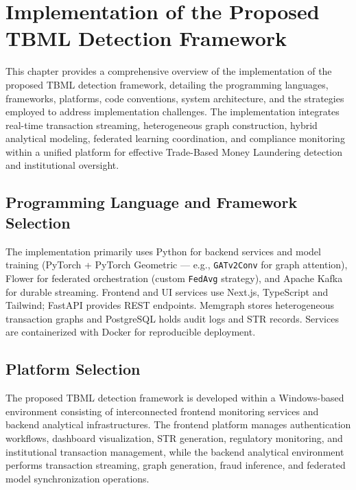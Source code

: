 \chapter{Implementation of the Proposed TBML Detection Framework}

This chapter provides a comprehensive overview of the implementation of the proposed TBML detection framework, detailing the programming languages, frameworks, platforms, code conventions, system architecture, and the strategies employed to address implementation challenges. The implementation integrates real-time transaction streaming, heterogeneous graph construction, hybrid analytical modeling, federated learning coordination, and compliance monitoring within a unified platform for effective Trade-Based Money Laundering detection and institutional oversight.

\section[Programming Language and Framework Selection]{\textbf{Programming Language and Framework Selection}}

The implementation primarily uses Python for backend services and model training (PyTorch + PyTorch Geometric — e.g., \texttt{GATv2Conv} for graph attention), Flower for federated orchestration (custom \texttt{FedAvg} strategy), and Apache Kafka for durable streaming. Frontend and UI services use Next.js, TypeScript and Tailwind; FastAPI provides REST endpoints. Memgraph stores heterogeneous transaction graphs and PostgreSQL holds audit logs and STR records. Services are containerized with Docker for reproducible deployment.

\section[Platform Selection]{\textbf{Platform Selection}}

The proposed TBML detection framework is developed within a Windows-based  environment consisting of interconnected frontend monitoring services and backend analytical infrastructures. The frontend platform manages authentication workflows, dashboard visualization, STR generation, regulatory monitoring, and institutional transaction management, while the backend analytical environment performs transaction streaming, graph generation, fraud inference, and federated model synchronization operations.

